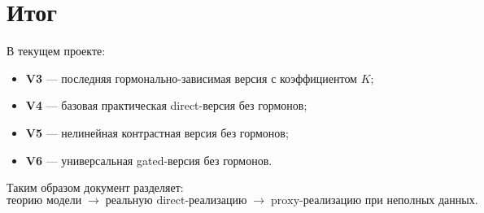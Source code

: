 \documentclass[12pt,a4paper]{article}
\begin{document}
\section{Итог}
В текущем проекте:
\begin{itemize}[leftmargin=1.2cm]
    \item \textbf{V3} --- последняя гормонально-зависимая версия с коэффициентом \(K\);
    \item \textbf{V4} --- базовая практическая direct-версия без гормонов;
    \item \textbf{V5} --- нелинейная контрастная версия без гормонов;
    \item \textbf{V6} --- универсальная gated-версия без гормонов.
\end{itemize}

Таким образом документ разделяет:
\[
\text{теорию модели}
\;\longrightarrow\;
\text{реальную direct-реализацию}
\;\longrightarrow\;
\text{proxy-реализацию при неполных данных}.
\]
\end{document}
